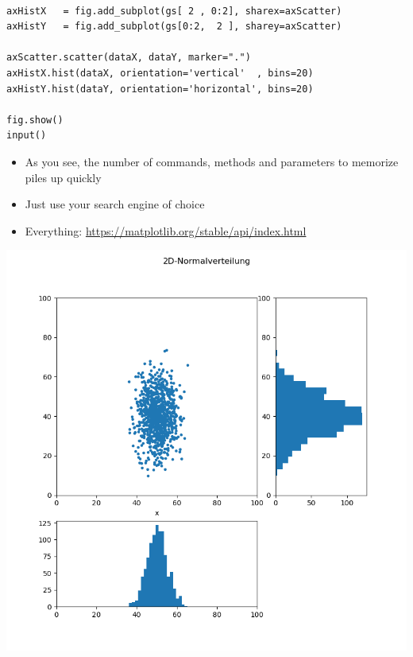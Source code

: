 \begin{frame}[fragile]
%
\begin{codebox}[... continued]
\begin{verbatim}

axHistX   = fig.add_subplot(gs[ 2 , 0:2], sharex=axScatter)
axHistY   = fig.add_subplot(gs[0:2,  2 ], sharey=axScatter)

axScatter.scatter(dataX, dataY, marker=".")
axHistX.hist(dataX, orientation='vertical'  , bins=20)
axHistY.hist(dataY, orientation='horizontal', bins=20)

fig.show()
input()
\end{verbatim}
\end{codebox}
%
\begin{itemize}
\item As you see, the number of commands, methods and parameters to memorize piles up quickly
\item Just use your search engine of choice
\item Everything: \url{https://matplotlib.org/stable/api/index.html}
\end{itemize}
%
\end{frame}


\begin{frame}[fragile]
%
\begin{tcolorbox}[title=2D Normal Distribution]
\begin{center}
	\includegraphics[width=.5\linewidth]{./gfx/plt-gauss2D}
\end{center}
\end{tcolorbox}
%
\end{frame}


